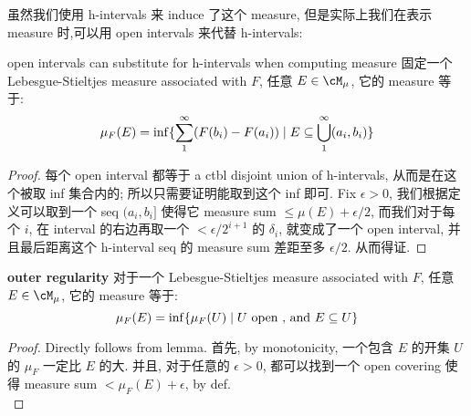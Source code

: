 \documentclass[lang=cn,11pt]{elegantbook}
\begin{document}
虽然我们使用 h-intervals 来 induce 了这个 measure, 但是实际上我们在表示 measure 时,可以用 open intervals 来代替 h-intervals:
\begin{lemma}{open intervals can substitute for h-intervals when computing measure}
固定一个 Lebesgue-Stieltjes measure associated with $F$, 任意 $E \in \cM_\mu$, 它的 measure 等于:$$
\mu_F(E) = \inf \{ \sum_1^\infty (F(b_i) - F(a_i))   \mid E \subseteq \bigcup_1^\infty (a_i, b_i)      \}
$$
\end{lemma}
\begin{proof}
    每个 open interval 都等于 a ctbl disjoint union of h-intervals, 从而是在这个被取 inf 集合内的; 所以只需要证明能取到这个 inf 即可.
    Fix $\epsilon > 0$, 我们根据定义可以取到一个 seq $(a_i, b_i]$ 使得它 measure sum $\leq \mu(E) + \epsilon /2$, 而我们对于每个 $i$, 在 interval 的右边再取一个 $ <\epsilon/2^{i+1}$ 的 $\delta_i$, 就变成了一个 open interval, 并且最后距离这个 h-interval seq 的 measure sum 差距至多 $\epsilon/2$. 从而得证.
\end{proof}


\begin{theorem}{\textbf{outer regularity}}
\label{outer regularity}
对于一个 Lebesgue-Stieltjes measure associated with $F$, 任意 $E \in \cM_\mu$, 它的 measure 等于:
\begin{equation}
    \mu_F(E) = \inf \{ \mu_F(U) \mid  U \text{ open , and } E \subseteq U  \}
\end{equation}
\end{theorem}


\begin{proof}
    Directly follows from lemma. 首先, by monotonicity, 一个包含 $E$ 的开集 $U$ 的 $\mu_F$ 一定比 $E$ 的大. 并且, 对于任意的 $\epsilon > 0$, 都可以找到一个 open covering 使得 measure sum $< \mu_F(E) + \epsilon$, by def.\\
\end{proof}
\end{document}
